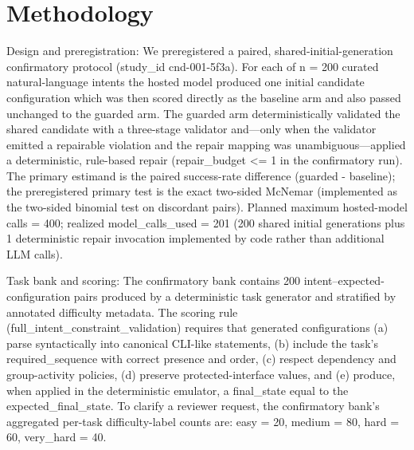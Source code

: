 \documentclass[conference]{IEEEtran}
\begin{document}
\section{Methodology}
Design and preregistration: We preregistered a paired, shared-initial-generation confirmatory protocol (study\_id cnd-001-5f3a). For each of n = 200 curated natural-language intents the hosted model produced one initial candidate configuration which was then scored directly as the baseline arm and also passed unchanged to the guarded arm. The guarded arm deterministically validated the shared candidate with a three-stage validator and---only when the validator emitted a repairable violation and the repair mapping was unambiguous---applied a deterministic, rule-based repair (repair\_budget <= 1 in the confirmatory run). The primary estimand is the paired success-rate difference (guarded - baseline); the preregistered primary test is the exact two-sided McNemar (implemented as the two-sided binomial test on discordant pairs). Planned maximum hosted-model calls = 400; realized model\_calls\_used = 201 (200 shared initial generations plus 1 deterministic repair invocation implemented by code rather than additional LLM calls).

Task bank and scoring: The confirmatory bank contains 200 intent--expected-configuration pairs produced by a deterministic task generator and stratified by annotated difficulty metadata. The scoring rule (full\_intent\_constraint\_validation) requires that generated configurations (a) parse syntactically into canonical CLI-like statements, (b) include the task's required\_sequence with correct presence and order, (c) respect dependency and group-activity policies, (d) preserve protected-interface values, and (e) produce, when applied in the deterministic emulator, a final\_state equal to the expected\_final\_state. To clarify a reviewer request, the confirmatory bank's aggregated per-task difficulty-label counts are: easy = 20, medium = 80, hard = 60, very\_hard = 40.
\end{document}
